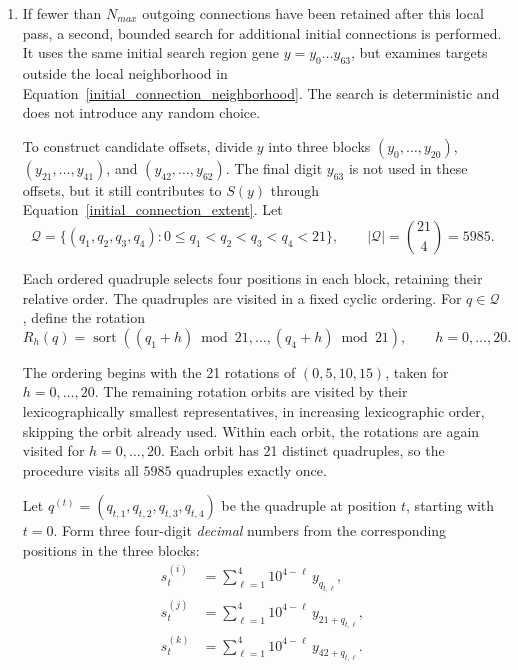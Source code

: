 \documentclass[12pt,a4paper]{article}
\begin{document}
\begin{enumerate}
	\item If fewer than $N_{max}$ outgoing connections have been retained after this local pass, a second, bounded search for additional initial connections is performed. It uses the same initial search region gene $y=y_0\ldots y_{63}$, but examines targets outside the local neighborhood in Equation~\ref{initial_connection_neighborhood}. The search is deterministic and does not introduce any random choice.

	To construct candidate offsets, divide $y$ into three blocks $(y_0,\ldots,y_{20})$, $(y_{21},\ldots,y_{41})$, and $(y_{42},\ldots,y_{62})$. The final digit $y_{63}$ is not used in these offsets, but it still contributes to $S(y)$ through Equation~\ref{initial_connection_extent}. Let
	\begin{equation}
	\mathcal{Q}=\big\{(q_1,q_2,q_3,q_4):0\leq q_1<q_2<q_3<q_4<21\big\},
	\qquad |\mathcal{Q}|=\binom{21}{4}=5985.
	\label{additional_connection_combinations}
	\end{equation}
	
	Each ordered quadruple selects four positions in each block, retaining their relative order. The quadruples are visited in a fixed cyclic ordering. For $q\in\mathcal{Q}$, define the rotation
	\begin{equation}
	R_h(q)=\operatorname{sort}\!\left((q_1+h)\bmod21,\ldots,(q_4+h)\bmod21\right),
	\qquad h=0,\ldots,20.
	\label{additional_connection_rotation}
	\end{equation}
	
	The ordering begins with the 21 rotations of $(0,5,10,15)$, taken for $h=0,\ldots,20$. The remaining rotation orbits are visited by their lexicographically smallest representatives, in increasing lexicographic order, skipping the orbit already used. Within each orbit, the rotations are again visited for $h=0,\ldots,20$. Each orbit has 21 distinct quadruples, so the procedure visits all $5985$ quadruples exactly once. 

	Let $q^{(t)}=(q_{t,1},q_{t,2},q_{t,3},q_{t,4})$ be the quadruple at position $t$, starting with $t=0$. Form three four-digit \emph{decimal} numbers from the corresponding positions in the three blocks:
	\begin{equation}
	\begin{aligned}
	 s_t^{(i)}&=\sum_{\ell=1}^{4}10^{4-\ell}\,y_{q_{t,\ell}},\\
	 s_t^{(j)}&=\sum_{\ell=1}^{4}10^{4-\ell}\,y_{21+q_{t,\ell}},\\
	 s_t^{(k)}&=\sum_{\ell=1}^{4}10^{4-\ell}\,y_{42+q_{t,\ell}}.
	\end{aligned}
	\label{additional_connection_decimal_numbers}
	\end{equation}
	

\end{enumerate}
\end{document}
